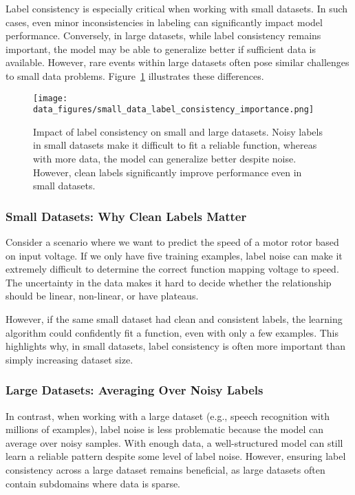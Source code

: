 \documentclass[12pt,openany]{book}
\begin{document}
Label consistency is especially critical when working with small datasets. In such cases, even minor inconsistencies in labeling can significantly impact model performance. Conversely, in large datasets, while label consistency remains important, the model may be able to generalize better if sufficient data is available. However, rare events within large datasets often pose similar challenges to small data problems. Figure~\ref{fig:small_data_label_consistency_importance} illustrates these differences.

\begin{figure}[H]
    \centering
    \texttt{[image: data\_figures/small\_data\_label\_consistency\_importance.png]}
    \caption{Impact of label consistency on small and large datasets. Noisy labels in small datasets make it difficult to fit a reliable function, whereas with more data, the model can generalize better despite noise. However, clean labels significantly improve performance even in small datasets.}
    \label{fig:small_data_label_consistency_importance}
\end{figure}

\subsubsection{Small Datasets: Why Clean Labels Matter}
Consider a scenario where we want to predict the speed of a motor rotor based on input voltage. If we only have five training examples, label noise can make it extremely difficult to determine the correct function mapping voltage to speed. The uncertainty in the data makes it hard to decide whether the relationship should be linear, non-linear, or have plateaus. \newline

However, if the same small dataset had clean and consistent labels, the learning algorithm could confidently fit a function, even with only a few examples. This highlights why, in small datasets, label consistency is often more important than simply increasing dataset size.

\subsubsection{Large Datasets: Averaging Over Noisy Labels}
In contrast, when working with a large dataset (e.g., speech recognition with millions of examples), label noise is less problematic because the model can average over noisy samples. With enough data, a well-structured model can still learn a reliable pattern despite some level of label noise. However, ensuring label consistency across a large dataset remains beneficial, as large datasets often contain subdomains where data is sparse.
\end{document}
